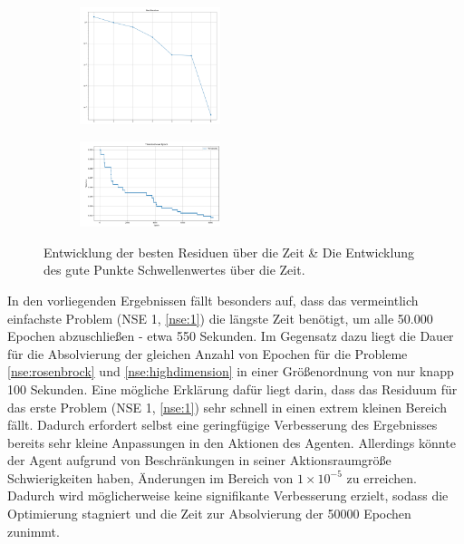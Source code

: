 \documentclass{article}
\theoremstyle{newline}
\begin{document}
\begin{onehalfspace}
\begin{figure}[h]
	\centering
	\begin{subfigure}
		\centering
		\includegraphics[width=0.45\textwidth]{Bilder/best_residuen.png}
		\label{fig:best_residuen}
	\end{subfigure}
	\hfill
	\begin{subfigure}
		\centering
		\includegraphics[width=0.45\textwidth]{Bilder/threshold_over_time.png}
		\label{fig:good_points_thrs}
	\end{subfigure}
	\caption{Entwicklung der besten Residuen über die Zeit \& Die Entwicklung des \glqq gute\grqq{} Punkte Schwellenwertes über die Zeit.}

\end{figure}


In den vorliegenden Ergebnissen fällt besonders auf, dass das vermeintlich einfachste Problem (NSE 1, \ref{nse:1}) die längste Zeit benötigt, um alle 50.000 Epochen abzuschließen - etwa 550 Sekunden. Im Gegensatz dazu liegt die Dauer für die Absolvierung der gleichen Anzahl von Epochen für die Probleme \ref{nse:rosenbrock} und \ref{nse:highdimension} in einer Größenordnung von nur knapp 100 Sekunden. Eine mögliche Erklärung dafür liegt darin, dass das Residuum für das erste Problem (NSE 1, \ref{nse:1}) sehr schnell in einen extrem kleinen Bereich fällt. Dadurch erfordert selbst eine geringfügige Verbesserung des Ergebnisses bereits sehr kleine Anpassungen in den Aktionen des Agenten. Allerdings könnte der Agent aufgrund von Beschränkungen in seiner Aktionsraumgröße Schwierigkeiten haben, Änderungen im Bereich von $1 \times 10^{-5}$ zu erreichen. Dadurch wird möglicherweise keine signifikante Verbesserung erzielt, sodass die Optimierung stagniert und die Zeit zur Absolvierung der 50000 Epochen zunimmt. 


\end{onehalfspace}
\end{document}
